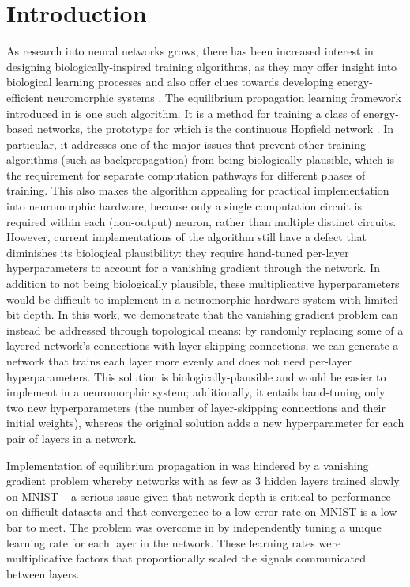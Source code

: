 \documentclass[utf8]{frontiersSCNS}
\begin{document}
\section{Introduction}

As research into neural networks grows, there has been increased interest in designing biologically-inspired training algorithms, as they may offer insight into biological learning processes and also offer clues towards developing energy-efficient neuromorphic systems \citep{wozniak2018, crafton2019, ernoult2020, bartunov2018, lillicrap2014, bengio2015}. The equilibrium propagation learning framework introduced in \citep{scellier17} is one such algorithm.  It is a method for training a class of energy-based networks, the prototype for which is the continuous Hopfield network \citep{hopfield1984}.  In particular, it addresses one of the major issues that prevent other training algorithms (such as backpropagation) from being biologically-plausible, which is the requirement for separate computation pathways for different phases of training. This also makes the algorithm appealing for practical implementation into neuromorphic hardware, because only a single computation circuit is required within each (non-output) neuron, rather than multiple distinct circuits. However, current implementations of the algorithm still have a defect that diminishes its biological plausibility: they require hand-tuned per-layer hyperparameters to account for a vanishing gradient through the network. In addition to not being biologically plausible, these multiplicative hyperparameters would be difficult to implement in a neuromorphic hardware system with limited bit depth. In this work, we demonstrate that the vanishing gradient problem can instead be addressed through topological means: by randomly replacing some of a layered network's connections with layer-skipping connections, we can generate a network that trains each layer more evenly and does not need per-layer hyperparameters. This solution is biologically-plausible and would be easier to implement in a neuromorphic system; additionally, it entails hand-tuning only two new hyperparameters (the number of layer-skipping connections and their initial weights), whereas the original solution adds a new hyperparameter for each pair of layers in a network.


Implementation of equilibrium propagation in \citep{scellier17} was hindered by a vanishing gradient problem whereby networks with as few as 3 hidden layers trained slowly on MNIST \citep{mnist1998} -- a serious issue given that network depth is critical to performance on difficult datasets \citep{simonyan2014, srivastava2015tvdn} and that convergence to a low error rate on MNIST is a low bar to meet. The problem was overcome in \citep{scellier17} by independently tuning a unique learning rate for each layer in the network.  These learning rates were multiplicative factors that proportionally scaled the signals communicated between layers.
\end{document}
